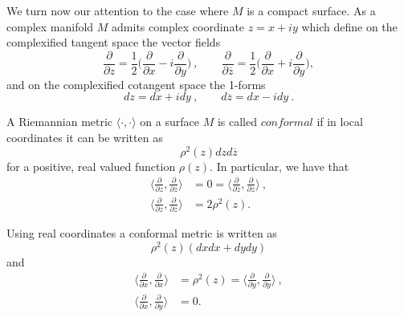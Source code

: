 We turn now our attention to the case where $M$ is a compact surface. As a complex manifold $M$ admits complex coordinate $z=x + iy$ which define on the complexified tangent space the vector fields
\[
\frac{\partial}{\partial z} = \frac{1}{2} \Big(\frac{\partial}{\partial x} -i \frac{\partial}{\partial y} \Big) \ , \qquad \frac{\partial}{\partial \overline{z}} = \frac{1}{2} \Big(\frac{\partial}{\partial x} + i \frac{\partial}{\partial y} \Big) ,
\]
and on the complexified cotangent space the 1-forms
\[
dz = dx + idy \ , \qquad d\overline{z} = dx - idy \ .
\]
\begin{definition}
    A Riemannian metric $\langle \cdot , \cdot \rangle$ on a surface $M$ is called $\textit{conformal}$ if in local coordinates it can be written as
    \[
        \rho^2(z) dz d\overline{z}
    \]
    for a positive, real valued function $\rho(z)$. In particular, we have that
    \[
    \begin{split}
        \Big\langle \frac{\partial}{\partial z}, \frac{\partial}{\partial z} \Big\rangle & = 0 = \Big\langle \frac{\partial}{\partial \overline{z}}, \frac{\partial}{\partial \overline{z}} \Big\rangle \ , \\
         \Big\langle \frac{\partial}{\partial z}, \frac{\partial}{\partial \overline{z}} \Big\rangle & = 2 \rho^2(z).
    \end{split}
    \]
\end{definition}
\begin{observation}
    Using real coordinates a conformal metric is written as 
    \[
        \rho^2(z) (dxdx + dydy)
    \]
    and
    \[
    \begin{split}
        \Big\langle \frac{\partial}{\partial x}, \frac{\partial}{\partial x} \Big\rangle & = \rho^2(z) = \Big\langle \frac{\partial}{\partial y}, \frac{\partial}{\partial y} \Big\rangle \ , \\
         \Big\langle \frac{\partial}{\partial x}, \frac{\partial}{\partial y} \Big\rangle & = 0.
    \end{split}
    \]
\end{observation}

